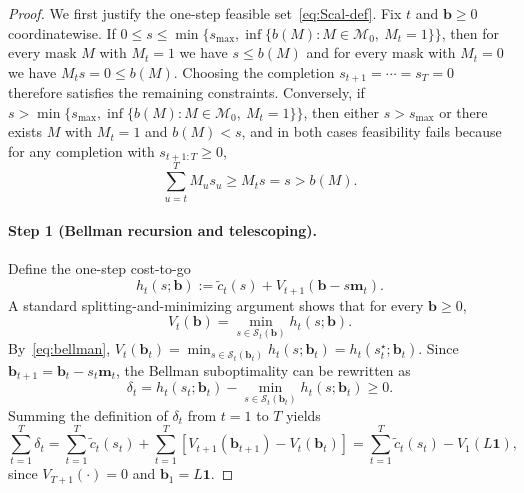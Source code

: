 \documentclass[11pt]{article}
\newcommand{\1}{\mathbf{1}}
\newcommand{\mcal}{\mathcal{M}}
\newcommand{\scalt}{\mathcal{S}_{t}}
\begin{document}
\begin{proof}
  We first justify the one-step feasible set~\eqref{eq:Scal-def}.
  Fix $t$ and $\mathbf{b} \geq 0$ coordinatewise.
  If $0 \leq s \leq \min\{s_{\max}, \inf\{b(M) : M \in \mcal_{0},\ M_t = 1\}\}$, then for every mask $M$ with $M_t = 1$ we have $s \leq b(M)$ and for every mask with $M_t = 0$ we have $M_t s = 0 \leq b(M)$.
  Choosing the completion $s_{t+1} = \cdots = s_T = 0$ therefore satisfies the remaining constraints.
  Conversely, if $s > \min\{s_{\max}, \inf\{b(M) : M \in \mcal_{0},\ M_t = 1\}\}$, then either $s > s_{\max}$ or there exists $M$ with $M_t = 1$ and $b(M) < s$, and in both cases feasibility fails because for any completion with $s_{t+1:T} \geq 0$,
  \begin{equation*}
    \sum_{u=t}^{T} M_u s_u \geq M_t s = s > b(M).
  \end{equation*}

  \paragraph{Step 1 (Bellman recursion and telescoping).}
  Define the one-step cost-to-go
  \begin{equation*}
    h_t(s;\mathbf{b}) := \tilde{c}_t(s) + V_{t+1}(\mathbf{b} - s \mathbf{m}_t).
  \end{equation*}
  A standard splitting-and-minimizing argument shows that for every $\mathbf{b} \geq 0$,
  \begin{equation}
    \label{eq:bellman}
    V_t(\mathbf{b}) = \min_{s \in \scalt(\mathbf{b})} h_t(s;\mathbf{b}).
  \end{equation}
  By~\eqref{eq:bellman}, $V_t(\mathbf{b}_t) = \min_{s \in \scalt(\mathbf{b}_t)} h_t(s;\mathbf{b}_t) = h_t(s_t^{\star};\mathbf{b}_t)$.
  Since $\mathbf{b}_{t+1} = \mathbf{b}_t - s_t \mathbf{m}_t$, the Bellman suboptimality can be rewritten as
  \begin{equation*}
    \delta_t = h_t(s_t;\mathbf{b}_t) - \min_{s \in \scalt(\mathbf{b}_t)} h_t(s;\mathbf{b}_t) \geq 0.
  \end{equation*}
  Summing the definition of $\delta_t$ from $t=1$ to $T$ yields
  \begin{equation*}
    \sum_{t=1}^{T} \delta_t
    = \sum_{t=1}^{T} \tilde{c}_t(s_t) + \sum_{t=1}^{T}\left[V_{t+1}(\mathbf{b}_{t+1}) - V_t(\mathbf{b}_t)\right]
    = \sum_{t=1}^{T} \tilde{c}_t(s_t) - V_1(L\1),
  \end{equation*}
  since $V_{T+1}(\cdot)=0$ and $\mathbf{b}_1=L\1$.


\end{proof}
\end{document}
